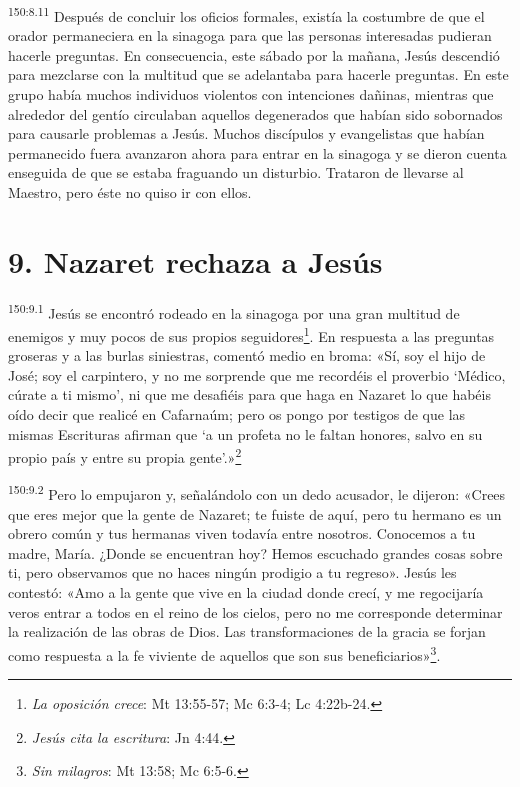 \par 
\textsuperscript{150:8.11} Después de concluir los oficios formales, existía la costumbre de que el orador permaneciera en la sinagoga para que las personas interesadas pudieran hacerle preguntas. En consecuencia, este sábado por la mañana, Jesús descendió para mezclarse con la multitud que se adelantaba para hacerle preguntas. En este grupo había muchos individuos violentos con intenciones dañinas, mientras que alrededor del gentío circulaban aquellos degenerados que habían sido sobornados para causarle problemas a Jesús. Muchos discípulos y evangelistas que habían permanecido fuera avanzaron ahora para entrar en la sinagoga y se dieron cuenta enseguida de que se estaba fraguando un disturbio. Trataron de llevarse al Maestro, pero éste no quiso ir con ellos.

\section*{9. Nazaret rechaza a Jesús}
\par 
\textsuperscript{150:9.1} Jesús se encontró rodeado en la sinagoga por una gran multitud de enemigos y muy pocos de sus propios seguidores\footnote{\textit{La oposición crece}: Mt 13:55-57; Mc 6:3-4; Lc 4:22b-24.}. En respuesta a las preguntas groseras y a las burlas siniestras, comentó medio en broma: «Sí, soy el hijo de José; soy el carpintero, y no me sorprende que me recordéis el proverbio `Médico, cúrate a ti mismo', ni que me desafiéis para que haga en Nazaret lo que habéis oído decir que realicé en Cafarnaúm; pero os pongo por testigos de que las mismas Escrituras afirman que `a un profeta no le faltan honores, salvo en su propio país y entre su propia gente'.»\footnote{\textit{Jesús cita la escritura}: Jn 4:44.}

\par 
\textsuperscript{150:9.2} Pero lo empujaron y, señalándolo con un dedo acusador, le dijeron: «Crees que eres mejor que la gente de Nazaret; te fuiste de aquí, pero tu hermano es un obrero común y tus hermanas viven todavía entre nosotros. Conocemos a tu madre, María. ¿Donde se encuentran hoy? Hemos escuchado grandes cosas sobre ti, pero observamos que no haces ningún prodigio a tu regreso». Jesús les contestó: «Amo a la gente que vive en la ciudad donde crecí, y me regocijaría veros entrar a todos en el reino de los cielos, pero no me corresponde determinar la realización de las obras de Dios. Las transformaciones de la gracia se forjan como respuesta a la fe viviente de aquellos que son sus beneficiarios»\footnote{\textit{Sin milagros}: Mt 13:58; Mc 6:5-6.}.

